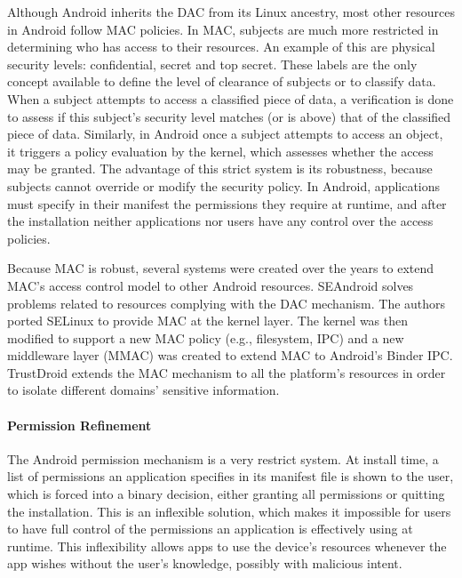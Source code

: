 Although Android inherits the \ac{DAC} from its Linux ancestry, most other resources in Android follow \ac{MAC} policies. In \ac{MAC}, subjects are much more restricted in determining who has access to their resources. An example of this are physical security levels: confidential, secret and top secret. These labels are the only concept available to define the level of clearance of subjects or to classify data. When a subject attempts to access a classified piece of data, a verification is done to assess if this subject's security level matches (or is above) that of the classified piece of data. Similarly, in Android once a subject attempts to access an object, it triggers a policy evaluation by the kernel, which assesses whether the access may be granted. The advantage of this strict system is its robustness, because subjects cannot override or modify the security policy. In Android, applications must specify in their manifest the permissions they require at runtime, and after the installation neither applications nor users have any control over the access policies.

Because \ac{MAC} is robust, several systems were created over the years to extend \ac{MAC}'s access control model to other Android resources. SEAndroid \cite{smalley2013security} solves problems related to resources complying with the \ac{DAC} mechanism. The authors ported SELinux \cite{peter2001integrating} to provide \ac{MAC} at the kernel layer. The kernel was then modified to support a new \ac{MAC} policy (e.g., filesystem, IPC) and a new middleware layer (MMAC) was created to extend \ac{MAC} to Android's Binder IPC. TrustDroid \cite{bugiel2011practical} extends the \ac{MAC} mechanism to all the platform's resources in order to isolate different domains' sensitive information.

\paragraph{\textbf{Permission Refinement}} %

The Android permission mechanism is a very restrict system. At install time, a list of permissions an application specifies in its manifest file is shown to the user, which is forced into a binary decision, either granting all permissions or quitting the installation. This is an inflexible solution, which makes it impossible for users to have full control of the permissions an application is effectively using at runtime. This inflexibility allows apps to use the device's resources whenever the app wishes without the user's knowledge, possibly with malicious intent. 

